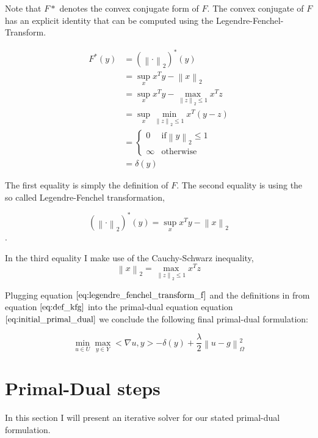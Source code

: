 \documentclass{paper}
\newcommand{\twonorm}[1]{\left\lVert#1\right\rVert_2}
\newcommand{\norm}[1]{\left\lVert#1\right\rVert}
\begin{document}
Note that $F*$ denotes the convex conjugate form of $F$. The convex conjugate of $F$ has an explicit identity that can be computed using the Legendre-Fenchel-Transform.

\begin{align}
	F^*(y) &= (\norm{\cdot}_2)^*(y) \nonumber \\
		  &= \sup_x x^T y - \twonorm{x} \nonumber \\
		  &= \sup_x x^T y - \max_{\twonorm{z} \leq 1} x^T z \nonumber \\
		  &= \sup_x \min_{\twonorm{z} \leq 1} x^T(y-z) \nonumber \\
		  &= \begin{cases}
   				0  			& \text{if} \twonorm{y} \leq 1 \\
   				\infty      & \text{otherwise}
  			 \end{cases} \nonumber \\
  		  &= \delta(y)
\label{eq:legendre_fenchel_transform_f}  		  
\end{align}

The first equality is simply the definition of $F$. The second equality is using the so called Legendre-Fenchel transformation,

\begin{equation}
	(\norm{\cdot}_2)^*(y) = \sup_x x^T y - \twonorm{x} \nonumber
\end{equation}. 

In the third equality I make use of the Cauchy-Schwarz inequality, 
\begin{equation}
	\twonorm{x} = \max_{\twonorm{z} \leq 1} x^T z
\end{equation}


Plugging equation $\ref{eq:legendre_fenchel_transform_f}$ and the definitions in from equation $\ref{eq:def_kfg}$ into the primal-dual equation equation $\ref{eq:initial_primal_dual}$ we conclude the following final primal-dual formulation:

\begin{equation}
\min_{u \in U} \max_{y \in Y} <\nabla u, y> - \delta(y) + \frac{\lambda}{2}\norm{u - g}^2_{\Omega}
\label{eq:final_primal_dual}
\end{equation}


\section{Primal-Dual steps}
In this section I will present an iterative solver for our stated primal-dual formulation.
\end{document}
